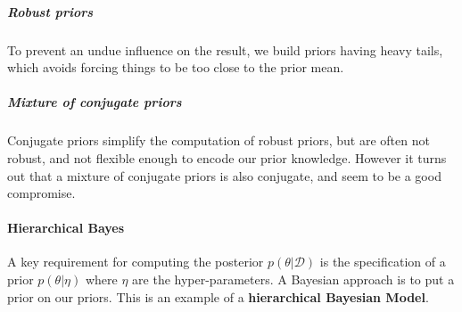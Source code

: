 \subparagraph{Robust priors}
To prevent an undue influence on the result, we build priors having heavy tails, which 
avoids forcing things to be too close to the prior mean.

\subparagraph{Mixture of conjugate priors}
Conjugate priors simplify the computation of robust priors, but are often not robust, and 
not flexible enough to encode our prior knowledge. However it turns out that a mixture of
conjugate priors is also conjugate, and seem to be a good compromise.

\paragraph{Hierarchical Bayes}
A key requirement for computing the posterior $p(\theta|\mathcal{D})$ is the 
specification of a prior $p(\theta|\eta)$ where $\eta$ are the hyper-parameters. A 
Bayesian approach is to put a prior on our priors. This is an example of a \textbf{
hierarchical Bayesian Model}.

